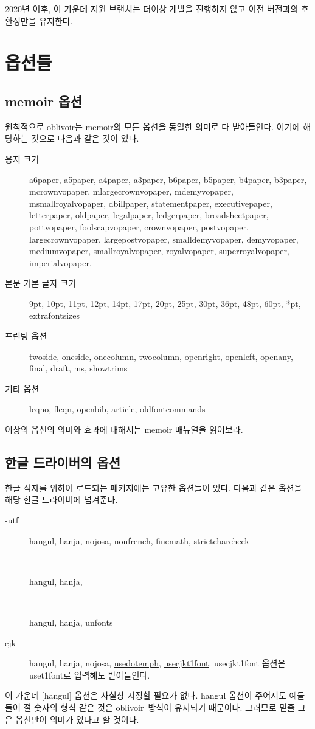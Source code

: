 \documentclass[
	12pt,
	a4paper,
	kosection,
	footnote,
	nobookmarks,
	microtype,
	figtabcapt,
]{oblivoir}
\newcommand\obclass{ob\-liv\-oir\oblivoirallowbreak}
\begin{document}
2020년 이후, 이 가운데  지원 브랜치는 더이상 개발을 진행하지 않고
이전 버전과의 호환성만을 유지한다.

\section{옵션들}

\subsection{memoir 옵션}

원칙적으로 oblivoir는 memoir의 모든 옵션을 동일한 의미로 다 받아들인다. 여기에 해당하는 것으로 
다음과 같은 것이 있다. 
\begin{description}
\item[용지 크기] a6paper, a5paper, a4paper, a3paper, b6paper, b5paper, b4paper, b3paper, mcrownvopaper, mlargecrownvopaper, mdemyvopaper, msmallroyalvopaper, dbillpaper, statementpaper, executivepaper, letterpaper, oldpaper, legalpaper, ledgerpaper, broadsheetpaper, pottvopaper, foolscapvopaper, crownvopaper, postvopaper, largecrownvopaper, largepostvopaper, smalldemyvopaper, demyvopaper, mediumvopaper, smallroyalvopaper, royalvopaper, superroyalvopaper, imperialvopaper.
\item[본문 기본 글자 크기] 9pt, 10pt, 11pt, 12pt, 14pt, 17pt, 20pt, 25pt, 30pt, 36pt, 48pt, 60pt, *pt, extrafontsizes
\item[프린팅 옵션] twoside, oneside, onecolumn, twocolumn, openright, openleft, openany, final, draft,
ms, showtrims
\item[기타 옵션] leqno, fleqn, openbib, article, oldfontcommands
\end{description}
이상의 옵션의 의미와 효과에 대해서는 memoir 매뉴얼을 읽어보라.

\subsection{한글 드라이버의 옵션}

한글 식자를 위하여 로드되는 패키지에는 고유한 옵션들이 있다.  다음과 같은 옵션을 해당
한글 드라이버에 넘겨준다.

\begin{description}
\item [\koTeX-utf] hangul, \uline{hanja}, nojosa, \uline{nonfrench}, \uline{finemath}, \uline{strictcharcheck}
\item [\XeTeX-\ko] hangul, hanja, %
\item [\LuaTeX-\ko] hangul, hanja, unfonts
\item [cjk-\ko] hangul, hanja, nojosa, \uline{usedotemph}, \uline{usecjkt1font}. usecjkt1font 옵션은 uset1font로 입력해도 받아들인다.
\end{description}
이 가운데 [hangul] 옵션은 사실상 지정할 필요가 없다. hangul 옵션이 주어져도 예들 들어 절 숫자의 형식 같은 것은 \obclass\ 방식이 유지되기 때문이다. 그러므로 밑줄 그은 옵션만이  의미가 있다고 할 것이다.
\end{document}

